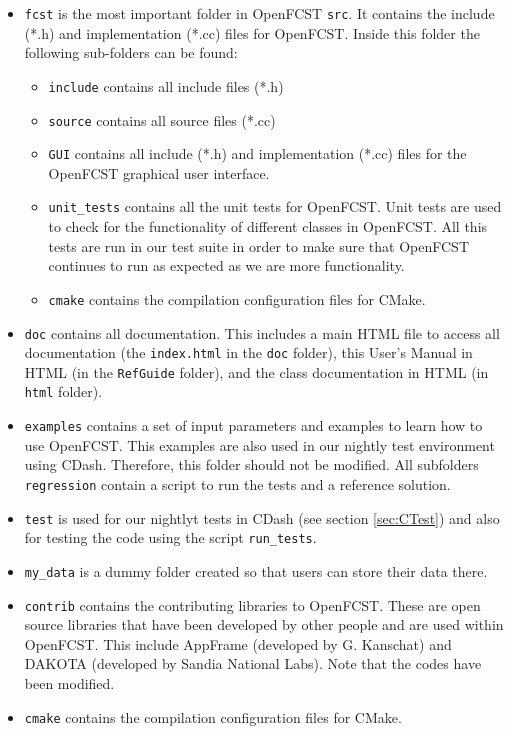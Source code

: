 \begin{itemize}
 \item \texttt{fcst} is the most important folder in OpenFCST \texttt{src}. It contains the include (*.h) and implementation (*.cc) files for OpenFCST. Inside this folder the following sub-folders can be found:
 \begin{itemize}
  \item \texttt{include} contains all include files (*.h)
  \item \texttt{source} contains all source files (*.cc)
  \item \texttt{GUI} contains all include (*.h) and implementation (*.cc) files for the OpenFCST graphical user interface.
  \item \texttt{unit_tests} contains all the unit tests for OpenFCST. Unit tests are used to check for the functionality of different classes in OpenFCST. All this tests are run in our test suite in order to make sure that OpenFCST continues to run as expected as we are more functionality.
  \item \texttt{cmake} contains the compilation configuration files for CMake.
 \end{itemize}
 \item \texttt{doc} contains all documentation. This includes a main HTML file to access all documentation (the \texttt{index.html} in the \texttt{doc} folder), this User’s Manual in HTML (in the \texttt{RefGuide} folder), and the class documentation in HTML (in \texttt{html} folder).
 \item \texttt{examples} contains a set of input parameters and examples to learn how to use OpenFCST. This examples are also used in our nightly test environment using CDash. Therefore, this folder should not be modified. All subfolders \texttt{regression} contain a script to run the tests and a reference solution.
 \item \texttt{test} is used for our nightlyt tests in CDash (see section \ref{sec:CTest}) and also for testing the code using the script \texttt{run\_tests}.
 \item \texttt{my_data} is a dummy folder created so that users can store their data there.
 \item \texttt{contrib} contains the contributing libraries to OpenFCST. These are open source libraries that have been developed by other people and are used within OpenFCST. This include AppFrame (developed by G. Kanschat) and DAKOTA (developed by Sandia National Labs). Note that the codes have been modified.
 \item \texttt{cmake} contains the compilation configuration files for CMake.
\end{itemize}

